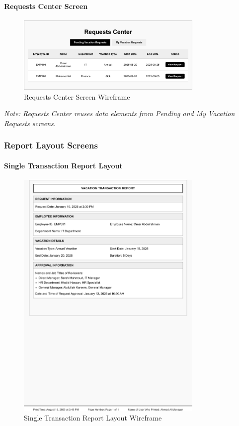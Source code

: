 \documentclass[12pt,a4paper]{article}
\begin{document}
\paragraph{Requests Center Screen}
\begin{figure}[H]
\centering
\includegraphics[width=0.8\textwidth]{Wireframes/Requests-Center/Requests-Center-1.png}
\caption{Requests Center Screen Wireframe}
\label{fig:wireframe-requests-center}
\end{figure}

\noindent\textit{Note: Requests Center reuses data elements from Pending and My Vacation Requests screens.}

\subsubsection{Report Layout Screens}

\paragraph{Single Transaction Report Layout}
\begin{figure}[H]
\centering
\includegraphics[width=0.8\textwidth]{Wireframes/Print-Layout-Single-Transaction-Report/Print-Layout-Single-Transaction-Report-1.png}
\caption{Single Transaction Report Layout Wireframe}
\label{fig:wireframe-single-transaction-report}
\end{figure}
\end{document}
